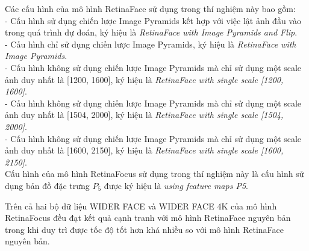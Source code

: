 {    Các cấu hình của mô hình RetinaFace sử dụng trong thí nghiệm này bao gồm: \\
    - Cấu hình sử dụng chiến lược Image Pyramids kết hợp với việc lật ảnh đầu vào trong quá trình dự đoán, ký hiệu là \textit{RetinaFace with Image Pyramids and Flip}. \\
    - Cấu hình chỉ sử dụng chiến lược Image Pyramids, ký hiệu là \textit{RetinaFace with Image Pyramids}. \\
    - Cấu hình không sử dụng chiến lược Image Pyramids mà chỉ sử dụng một scale ảnh duy nhất là [1200, 1600], ký hiệu là \textit{RetinaFace with single scale [1200, 1600]}. \\
    - Cấu hình không sử dụng chiến lược Image Pyramids mà chỉ sử dụng một scale ảnh duy nhất là [1504, 2000], ký hiệu là \textit{RetinaFace with single scale [1504, 2000]}. \\
    - Cấu hình không sử dụng chiến lược Image Pyramids mà chỉ sử dụng một scale ảnh duy nhất là [1600, 2150], ký hiệu là \textit{RetinaFace with single scale [1600, 2150]}. \\
    Cấu hình của mô hình RetinaFocus sử dụng trong thí nghiệm này là cấu hình sử dụng bản đồ đặc trưng $P_5$ được ký hiệu là \textit{using feature maps P5}.


    \noindent
    Trên cả hai bộ dữ liệu WIDER FACE và WIDER FACE 4K của mô hình RetinaFocus đều đạt kết quả cạnh tranh với mô hình RetinaFace nguyên bản trong khi duy trì được tốc độ tốt hơn khá nhiều so với mô hình RetinaFace nguyên bản.
}